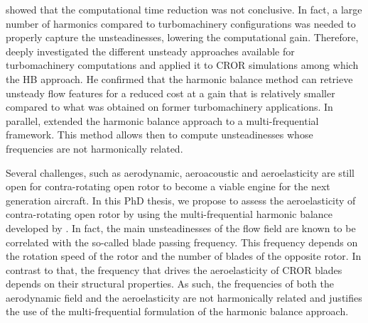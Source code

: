 showed that the computational time reduction
was not conclusive. In fact, a large number of 
harmonics compared to turbomachinery configurations
was needed to properly capture the unsteadinesses, lowering
the computational gain.
Therefore, \citet{ThesisFrancois} deeply
investigated the different unsteady approaches available 
for turbomachinery computations and applied it to CROR simulations
among which the HB approach. 
He confirmed that
the harmonic balance method can retrieve unsteady
flow features for a reduced cost at a gain that
is relatively smaller compared to what was
obtained on former turbomachinery applications.
In parallel, \citet{ThesisGuedeney} extended the harmonic
balance approach to a multi-frequential framework. 
This method allows then to compute unsteadinesses whose frequencies
are not harmonically related.
\newline

Several challenges, such as aerodynamic,
aeroacoustic and aeroelasticity are still open 
for contra-rotating open rotor
to become a viable engine for the next generation aircraft.
In this PhD thesis, we propose to assess the aeroelasticity of 
contra-rotating open rotor by using the multi-frequential
harmonic balance developed by \citet{ThesisGuedeney}.
In fact, the main unsteadinesses of the flow field
are known to be correlated with the so-called
blade passing frequency. This frequency depends on the
rotation speed of the rotor and the number of blades
of the opposite rotor. In contrast to that, the 
frequency that drives the aeroelasticity of CROR
blades depends on their structural properties.
As such, the frequencies of both the aerodynamic
field and the aeroelasticity are not harmonically
related and justifies the use of the multi-frequential
formulation of the harmonic balance approach.


